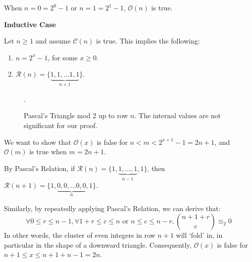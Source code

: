 \documentclass{article}
\newcommand{\pred}{\mathcal{O}}
\newcommand{\conject}{\mathcal{C}}
\newcommand{\modrow}{\mathcal{R}}
\newcommand{\drawemptyrow}[4]{
    \node at (#2/4, #3/4) {#4};
    \node at (#2/-4, #3/4) {#4};
  }
\newcommand{\drawrow}[4]{
  \drawemptyrow{#1}{#2}{#3}{#4}
  \foreach \i in {0,...,#1}{
    \node at (#2/-4-\i/-2,#3/4){#4};
  }
}
\newcommand{\drawoddtriangle}[2]{
  \foreach \i in {0,...,7}{
    \drawemptyrow{\i}{#1+0+\i}{#2+7-\i}{1}
   }
   \drawrow{7}{#1+7}{#2+21}{1}
  }
\begin{document}
When $n = 0 = 2^0-1$ or $n=1=2^1-1$, $\pred(n)$ is true.

\begin{center}\item\textbf{Inductive Case} \end{center}

Let $n\geq 1$ and assume $\conject(n)$ is true. This implies the following:
\begin{enumerate}
  \item $n = 2^x - 1$, for some $x \geq 0$.
  \item $\modrow(n) = \{\underbrace{1,1,...1,1}_{n+1}\}$.
\end{enumerate}

\begin{figure}[H]
\centering
{}
\caption {Pascal's Triangle mod 2 up to row $n$. The internal values are not significant for our proof.}.
\end{figure}

We want to show that $\pred(x)$ is false for $n < m < 2^{x+1}-1 = 2n+1$, and $\pred(m)$ is true when $m = 2n+1$.

By Pascal's Relation, if $\modrow(n) = \{1,\underbrace{1,...,1}_{n-1},1\}$, 
then $\modrow(n+1) = \{1,\underbrace{0,0,...0,0}_{n},1\}$.

\begin{figure}[H]
\centering
{}
\end{figure}

Similarly, by repeatedly applying Pascal's Relation, we can derive that:
$$
\forall 0 \leq r \leq n-1, \forall 1+r\leq c \leq n \text{ or } n\leq c \leq n-r, {n+1+r \choose c} \equiv_2 0
$$
In other words, the cluster of even integers in row $n+1$ will `fold' in, in particular in the shape of a downward triangle. Consequently, $\pred(x)$ is false for $n+1\leq x \leq n+1+n-1 = 2n$.

\begin{figure}[H]
\centering
{}
\end{figure}
\end{document}
